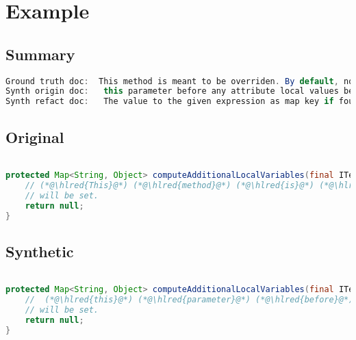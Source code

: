 \documentclass[11pt]{article}
\DeclareRobustCommand{\hlred}[1]{{\sethlcolor{YellowOrange}\hl{#1}}}
\begin{document}

  \pagebreak
  \section{Example}
  \subsection{Summary}

  \begin{lstlisting}[language=java]
Ground truth doc:  This method is meant to be overriden. By default, no local variables
Synth origin doc:   this parameter before any attribute local values before tag parsing is executed is not
Synth refact doc:   The value to the given expression as map key if found then value as
  \end{lstlisting}

  \subsection{Original}
  \begin{lstlisting}[language=java]

protected Map<String, Object> computeAdditionalLocalVariables(final ITemplateContext context, final IProcessableElementTag tag, final AttributeName attributeName, final String attributeValue, final IStandardExpression expression) {
    // (*@\hlred{This}@*) (*@\hlred{method}@*) (*@\hlred{is}@*) (*@\hlred{meant}@*) (*@\hlred{to}@*) (*@\hlred{be}@*) (*@\hlred{overriden.}@*) (*@\hlred{By}@*) (*@\hlred{default,}@*) (*@\hlred{no}@*) (*@\hlred{local}@*) (*@\hlred{variables}@*)
    // will be set.
    return null;
}
  \end{lstlisting}
  \subsection{Synthetic}

  \begin{lstlisting}[language=java]

protected Map<String, Object> computeAdditionalLocalVariables(final ITemplateContext context, final IProcessableElementTag tag, final AttributeName attributeName, final String attributeValue, final IStandardExpression expression) {
    //  (*@\hlred{this}@*) (*@\hlred{parameter}@*) (*@\hlred{before}@*) (*@\hlred{any}@*) (*@\hlred{attribute}@*) (*@\hlred{local}@*) (*@\hlred{values}@*) (*@\hlred{before}@*) (*@\hlred{tag}@*) (*@\hlred{parsing}@*) (*@\hlred{is}@*) (*@\hlred{executed is not}@*)
    // will be set.
    return null;
}
  \end{lstlisting}
\end{document}
